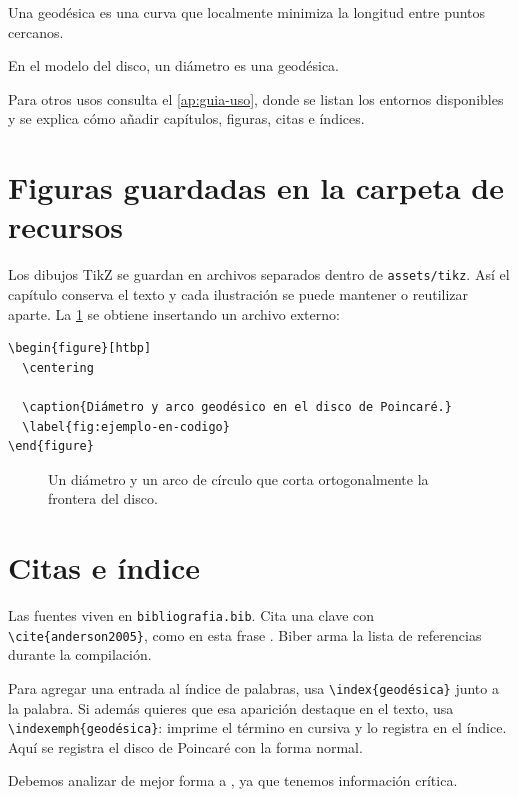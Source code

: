 \begin{definition}[Geodésica]
Una geodésica es una curva que localmente minimiza la longitud entre puntos cercanos.
\end{definition}

\begin{example}
En el modelo del disco, un diámetro es una geodésica.
\end{example}

Para otros usos consulta el \cref{ap:guia-uso}, donde se listan los entornos disponibles y se explica cómo añadir capítulos, figuras, citas e índices.

\section{Figuras guardadas en la carpeta de recursos}

Los dibujos TikZ se guardan en archivos separados dentro de \texttt{assets/tikz}. Así el capítulo conserva el texto y cada ilustración se puede mantener o reutilizar aparte. La \cref{fig:tikz-incrustado} se obtiene insertando un archivo externo:

\begin{verbatim}
\begin{figure}[htbp]
  \centering
  
  \caption{Diámetro y arco geodésico en el disco de Poincaré.}
  \label{fig:ejemplo-en-codigo}
\end{figure}
\end{verbatim}

\begin{figure}[htbp]
  \centering
  
  \caption{Un diámetro y un arco de círculo que corta ortogonalmente la frontera del disco.}
  \label{fig:tikz-incrustado}
\end{figure}

\section{Citas e índice}

Las fuentes viven en \texttt{bibliografia.bib}. Cita una clave con \verb|\cite{anderson2005}|, como en esta frase \cite{anderson2005}. Biber arma la lista de referencias durante la compilación.

Para agregar una entrada al índice de palabras, usa \verb|\index{geodésica}| junto a la palabra. Si además quieres que esa aparición destaque en el texto, usa \verb|\indexemph{geodésica}|: imprime el término en cursiva y lo registra en el índice. Aquí se registra el disco de Poincaré con la forma normal.

Debemos analizar de mejor forma a , ya que tenemos información crítica.
